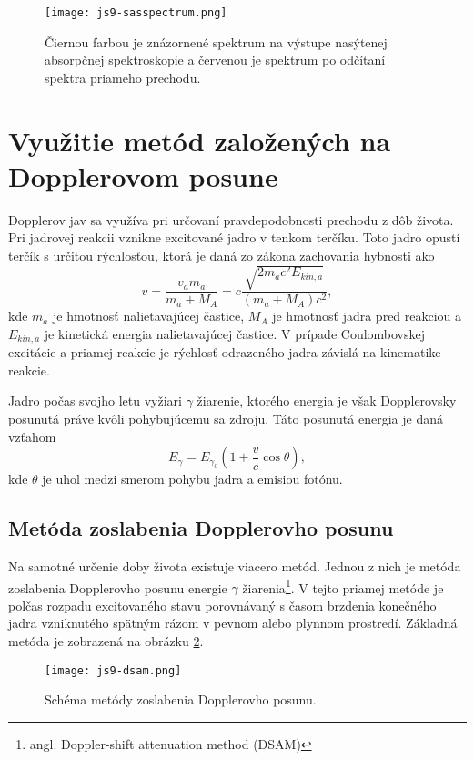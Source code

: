 \documentclass[../../main.tex]{subfiles}
\begin{document}
\begin{figure}[h!]
\centering
\texttt{[image: js9-sasspectrum.png]}
\caption{Čiernou farbou je znázornené spektrum na výstupe nasýtenej absorpčnej spektroskopie a červenou je spektrum po odčítaní spektra priameho prechodu.}
\label{js9:img:sasspectrum}
\end{figure}

\section{Využitie metód založených na Dopplerovom posune}

Dopplerov jav sa využíva pri určovaní pravdepodobnosti prechodu z dôb života. Pri jadrovej reakcii vznikne excitované jadro v tenkom terčíku. Toto jadro opustí terčík s určitou rýchlosťou, ktorá je daná zo zákona zachovania hybnosti ako
\begin{equation}
v=\dfrac{v_am_a}{m_a+M_A}=c\dfrac{\sqrt{2m_ac^2E_{kin,a}}}{(m_a+M_A)c^2},
\end{equation}
kde $m_a$ je hmotnosť nalietavajúcej častice, $M_A$ je hmotnosť jadra pred reakciou a $E_{kin,a}$ je kinetická energia nalietavajúcej častice. V prípade Coulombovskej excitácie a priamej reakcie je rýchlosť odrazeného jadra závislá na kinematike reakcie.

Jadro počas svojho letu vyžiari $\gamma$ žiarenie, ktorého energia je však Dopplerovsky posunutá práve kvôli pohybujúcemu sa zdroju. Táto posunutá energia je daná vzťahom
\begin{equation}
E_\gamma=E_{\gamma_0}\left(1+\frac{v}{c}\cos\theta\right),
\end{equation}
kde $\theta$ je uhol medzi smerom pohybu jadra a emisiou fotónu. 

\subsection{Metóda zoslabenia Dopplerovho posunu}

Na samotné určenie doby života existuje viacero metód. Jednou z nich je metóda zoslabenia Dopplerovho posunu energie $\gamma$ žiarenia\footnote{angl. Doppler-shift attenuation method (DSAM)}. V tejto priamej metóde je polčas rozpadu excitovaného stavu porovnávaný s časom brzdenia konečného jadra vzniknutého spätným rázom v pevnom alebo plynnom prostredí. Základná metóda je zobrazená na obrázku \ref{js9:img:dsam}.

\begin{figure}[h!]
\centering
\texttt{[image: js9-dsam.png]}
\caption{Schéma metódy zoslabenia Dopplerovho posunu.}
\label{js9:img:dsam}
\end{figure}
\end{document}
